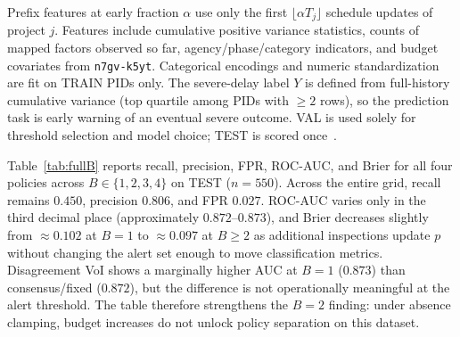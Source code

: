 Prefix features at early fraction $\alpha$ use only the first $\lfloor\alpha T_j\rfloor$ schedule updates of project $j$. Features include cumulative positive variance statistics, counts of mapped factors observed so far, agency/phase/category indicators, and budget covariates from \texttt{n7gv-k5yt}. Categorical encodings and numeric standardization are fit on TRAIN PIDs only. The severe-delay label $Y$ is defined from full-history cumulative variance (top quartile among PIDs with ${\geq}2$ rows), so the prediction task is early warning of an eventual severe outcome. VAL is used solely for threshold selection and model choice; TEST is scored once~\cite{Egwim2021,Tagharobi2025}.

Table~\ref{tab:fullB} reports recall, precision, FPR, ROC-AUC, and Brier for all four policies across $B\in\{1,2,3,4\}$ on TEST ($n{=}550$). Across the entire grid, recall remains $0.450$, precision $0.806$, and FPR $0.027$. ROC-AUC varies only in the third decimal place (approximately $0.872$--$0.873$), and Brier decreases slightly from ${\approx}0.102$ at $B{=}1$ to ${\approx}0.097$ at $B{\geq}2$ as additional inspections update $p$ without changing the alert set enough to move classification metrics. Disagreement VoI shows a marginally higher AUC at $B{=}1$ ($0.873$) than consensus/fixed ($0.872$), but the difference is not operationally meaningful at the alert threshold. The table therefore strengthens the $B{=}2$ finding: under absence clamping, budget increases do not unlock policy separation on this dataset.

